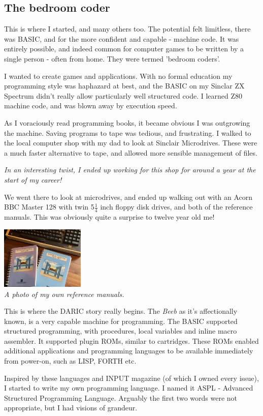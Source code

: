 \documentclass[10pt]{book}
\newcommand{\DARIC}{DARIC}
\begin{document}
\subsection{The bedroom coder}
\par{This is where I started, and many others too. The potential felt limitless, there was BASIC, and for the more confident and capable - machine code. It was entirely possible, and indeed common for computer games to be written by a single person - often from home. They were termed 'bedroom coders'.}
\par{I wanted to create games and applications. With no formal education my programming style was haphazard at best, and the BASIC on my Sinclar ZX Spectrum didn't really allow particularly well structured code. I learned Z80 machine code, and was blown away by execution speed.}
\par{As I voraciously read programming books, it became obvious I was outgrowing the machine. Saving programs to tape was tedious, and frustrating. I walked to the local computer shop with my dad to look at Sinclair Microdrives. These were a much faster alternative to tape, and allowed more sensible management of files.}
\par{\emph{In an interesting twist, I ended up working for this shop for around a year at the start of my career!}}
\par{We went there to look at microdrives, and ended up walking out with an Acorn BBC Master 128 with twin 5$\frac{1}{4}$ inch floppy disk drives, and both of the reference manuals. This was obviously quite a surprise to twelve year old me! }
\begin{center}
\includegraphics[height=3cm]{Photo 08-02-2022, 11 46 37.jpg}\\
\scriptsize{\emph{A photo of my own reference manuals.}}
\end{center}
\par{This is where the \DARIC{} story really begins. The \emph{Beeb} as it's affectionally known, is a very capable machine for programming. The BASIC supported structured programming, with procedures, local variables and inline macro assembler. It supported plugin ROMs, similar to cartridges. These ROMs enabled additional applications and programming languages to be available immediately from power-on, such as LISP, FORTH etc.}
\par{Inspired by these languages and INPUT magazine (of which I owned every issue), I started to write my own programming language. I named it ASPL - Advanced Structured Programming Language. Arguably the first two words were not appropriate, but I had visions of grandeur.}
\end{document}
